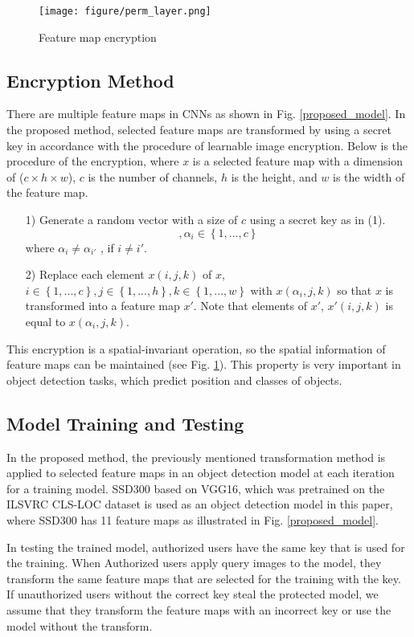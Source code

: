 \documentclass[conference,10pt,a4paper]{IEEEtran}
\begin{document}
\begin{figure}[tb]
    \centering
    \texttt{[image: figure/perm\_layer.png]}
    \caption{Feature map encryption\cite{ito2021access}}
    \label{transform}
\end{figure}

\subsection{Encryption Method}
There are multiple feature maps in CNNs as shown in Fig. \ref{proposed_model}. In the proposed method, selected feature maps are transformed by using a secret key in accordance with the procedure of learnable image encryption\cite{maungmaung_kiya_2021,adv-def}. Below is the procedure of the encryption, where  $x$ is a selected feature map with a dimension of ($c \times h \times w$), $c$ is the number of channels, $h$ is the height, and $w$ is the width of the feature map.
\begin{itemize}
    \item[1)]Generate a random vector with a size of $c$ using a secret key as in (1).
        \begin{equation}
            [\alpha_1,.,\alpha_i,\alpha_{i'},...,\alpha_c],\alpha_i \in \left\{1,...,c\right\}
        \end{equation}
         where{ $\alpha_i \ne \alpha_{i'}$ }, if $i\ne i'$.\par
    \item[2)]Replace each element $x(i,j,k)$ of $x$, $i\in \left\{1,...,c\right\}, j \in \left\{1,...,h\right\}, k \in \left\{1,...,w\right\}$ with $x(\alpha_i,j,k)$ so that $x$ is transformed into a feature map $x'$. Note that elements of $x'$, $x'(i,j,k)$ is equal to $x(\alpha_i,j,k)$.
\end{itemize}
This encryption is a spatial-invariant operation, so the spatial information of feature maps can be maintained (see Fig. \ref{transform}). This property is very important in object detection tasks, which predict position and classes of objects. 

\subsection{Model Training and Testing}
In the proposed method, the previously mentioned transformation method is applied to selected feature maps in an object detection model at each iteration for a training model.
 SSD300\cite{liu2016ssd} based on VGG16\cite{simonyan2014very}, which was pretrained on the ILSVRC CLS-LOC dataset\cite{russakovsky2015imagenet}  is used as an object detection model in this
paper, where SSD300 has 11 feature maps as illustrated in Fig. \ref{proposed_model}. \par
In testing the trained model, authorized users have the same key that is used for the training. When Authorized users apply query images to the model, they transform the same feature maps that are selected for the training with the key. If unauthorized users without the correct key steal the protected model, we assume that they transform the feature maps with an incorrect key or use the model without the transform.
\end{document}

